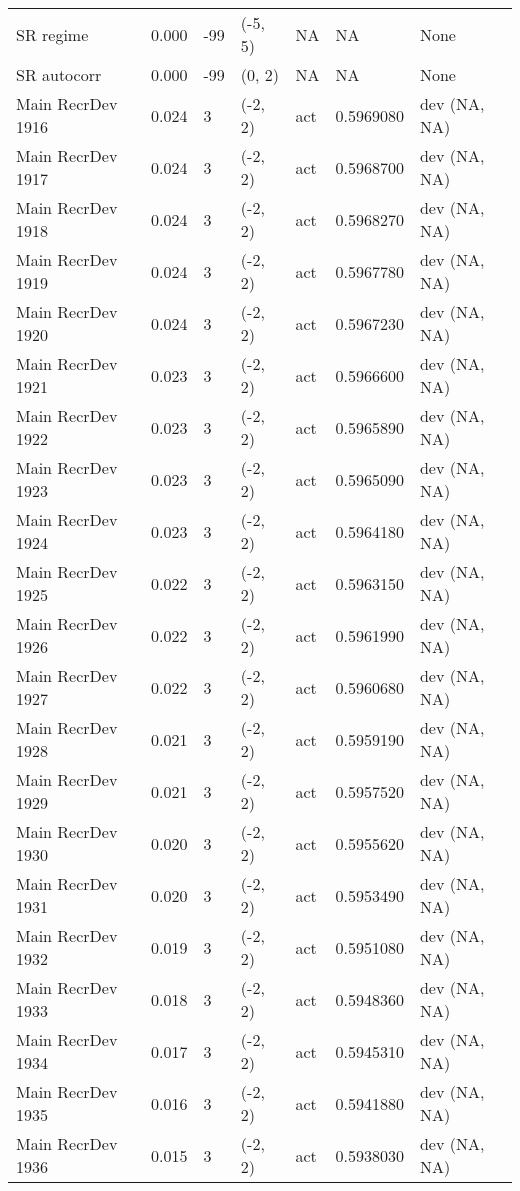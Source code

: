 \documentclass[11pt,
  english,
  a4paper,
]{article}
\begin{document}
\begin{landscape}
\begin{longtable}[t]{>{\raggedright\arraybackslash}p{6cm}lllll>{\raggedright\arraybackslash}p{4cm}}
SR regime & 0.000 & -99 & (-5, 5) & NA & NA & None\\
SR autocorr & 0.000 & -99 & (0, 2) & NA & NA & None\\
Main RecrDev 1916 & 0.024 & 3 & (-2, 2) & act & 0.5969080 & dev (NA, NA)\\
Main RecrDev 1917 & 0.024 & 3 & (-2, 2) & act & 0.5968700 & dev (NA, NA)\\
Main RecrDev 1918 & 0.024 & 3 & (-2, 2) & act & 0.5968270 & dev (NA, NA)\\
Main RecrDev 1919 & 0.024 & 3 & (-2, 2) & act & 0.5967780 & dev (NA, NA)\\
Main RecrDev 1920 & 0.024 & 3 & (-2, 2) & act & 0.5967230 & dev (NA, NA)\\
Main RecrDev 1921 & 0.023 & 3 & (-2, 2) & act & 0.5966600 & dev (NA, NA)\\
Main RecrDev 1922 & 0.023 & 3 & (-2, 2) & act & 0.5965890 & dev (NA, NA)\\
Main RecrDev 1923 & 0.023 & 3 & (-2, 2) & act & 0.5965090 & dev (NA, NA)\\
Main RecrDev 1924 & 0.023 & 3 & (-2, 2) & act & 0.5964180 & dev (NA, NA)\\
Main RecrDev 1925 & 0.022 & 3 & (-2, 2) & act & 0.5963150 & dev (NA, NA)\\
Main RecrDev 1926 & 0.022 & 3 & (-2, 2) & act & 0.5961990 & dev (NA, NA)\\
Main RecrDev 1927 & 0.022 & 3 & (-2, 2) & act & 0.5960680 & dev (NA, NA)\\
Main RecrDev 1928 & 0.021 & 3 & (-2, 2) & act & 0.5959190 & dev (NA, NA)\\
Main RecrDev 1929 & 0.021 & 3 & (-2, 2) & act & 0.5957520 & dev (NA, NA)\\
Main RecrDev 1930 & 0.020 & 3 & (-2, 2) & act & 0.5955620 & dev (NA, NA)\\
Main RecrDev 1931 & 0.020 & 3 & (-2, 2) & act & 0.5953490 & dev (NA, NA)\\
Main RecrDev 1932 & 0.019 & 3 & (-2, 2) & act & 0.5951080 & dev (NA, NA)\\
Main RecrDev 1933 & 0.018 & 3 & (-2, 2) & act & 0.5948360 & dev (NA, NA)\\
Main RecrDev 1934 & 0.017 & 3 & (-2, 2) & act & 0.5945310 & dev (NA, NA)\\
Main RecrDev 1935 & 0.016 & 3 & (-2, 2) & act & 0.5941880 & dev (NA, NA)\\
Main RecrDev 1936 & 0.015 & 3 & (-2, 2) & act & 0.5938030 & dev (NA, NA)\\

\end{longtable}
\end{landscape}
\end{document}
